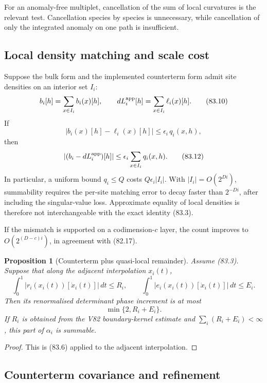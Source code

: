 \documentclass[11pt]{article}
\newtheorem{proposition}[theorem]{Proposition}
\begin{document}
For an anomaly-free multiplet, cancellation of the sum of local
curvatures is the relevant test.  Cancellation species by species is
unnecessary, while cancellation of only the integrated anomaly on
one path is insufficient.

\subsection{Local density matching and scale cost}

Suppose the bulk form and the implemented counterterm form admit site
densities on an interior set \(I_i\):
\[
 b_i[h]=\sum_{x\in I_i}b_i(x)[h],\qquad
 dL_i^{\rm app}[h]=\sum_{x\in I_i}\ell_i(x)[h].              \tag{83.10}
\]
If
\[
                         |b_i(x)[h]-\ell_i(x)[h]|
                         \le\epsilon_i\,q_i(x,h),            \tag{83.11}
\]
then
\[
 |(b_i-dL_i^{\rm app})[h]|
       \le\epsilon_i\sum_{x\in I_i}q_i(x,h).                 \tag{83.12}
\]
In particular, a uniform bound \(q_i\le Q\) costs
\(Q\epsilon_i|I_i|\).  With \(|I_i|=O(2^{Di})\), summability requires
the per-site matching error to decay faster than \(2^{-Di}\), after
including the singular-value loss.  Approximate equality of local
densities is therefore not interchangeable with the exact identity
(83.3).

If the mismatch is supported on a codimension-\(c\) layer, the count
improves to \(O(2^{(D-c)i})\), in agreement with (82.17).

\begin{proposition}[Counterterm plus quasi-local remainder]
\label{prop:v11v83-shell}
Assume (83.3).  Suppose that along the adjacent interpolation
\(x_i(t)\),
\[
 \int_0^1|r_i(x_i(t))[\dot x_i(t)]|\,dt\le R_i,\qquad
 \int_0^1|e_i(x_i(t))[\dot x_i(t)]|\,dt\le E_i.              \tag{83.13}
\]
Then its renormalised determinant phase increment is at most
\[
                                     \min\{2,R_i+E_i\}.       \tag{83.14}
\]
If \(R_i\) is obtained from the V82 boundary-kernel estimate and
\(\sum_i(R_i+E_i)<\infty\), this part of \(\alpha_i\) is summable.
\end{proposition}

\begin{proof}
This is (83.6) applied to the adjacent interpolation.
\end{proof}

\subsection{Counterterm covariance and refinement}
\end{document}
